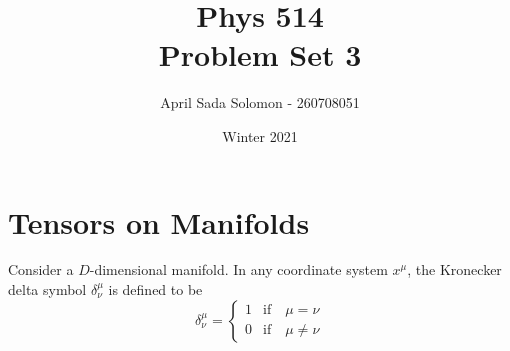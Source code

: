 \documentclass{article}
\title{Phys 514 \\
	\large Problem Set 3}
\author{April Sada Solomon - 260708051}
\date{Winter 2021}
\begin{document}
	\maketitle
	\thispagestyle{empty}
	\pagebreak
	
	\cfoot{\thepage}
	
	\tableofcontents
	\newpage
	
	
	\setcounter{page}{1}
	\cfoot{\thepage}
	\section{Tensors on Manifolds}
		Consider a $D$-dimensional manifold. In any coordinate system $x^\mu$, the Kronecker delta symbol $\delta_\nu^\mu$ is defined to be
		$$ \delta_\nu^\mu = \begin{cases}
			1 & \text{if} \quad \mu = \nu  \\
			0 & \text{if} \quad \mu \neq \nu
		\end{cases}$$
\end{document}
